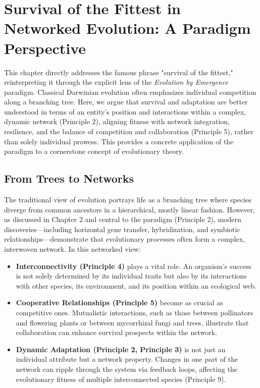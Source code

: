 \documentclass[12pt,openany]{book}
\begin{document}
\chapter{Survival of the Fittest in Networked Evolution: A Paradigm Perspective} %
\label{ch:NetworkedFitness}

This chapter directly addresses the famous phrase "survival of the fittest," reinterpreting it through the explicit lens of the \emph{Evolution by Emergence} paradigm. Classical Darwinian evolution often emphasizes individual competition along a branching tree. Here, we argue that survival and adaptation are better understood in terms of an entity's position and interactions within a complex, dynamic network (Principle 2), aligning fitness with network integration, resilience, and the balance of competition and collaboration (Principle 5), rather than solely individual prowess. This provides a concrete application of the paradigm to a cornerstone concept of evolutionary theory. %

\section{From Trees to Networks}
The traditional view of evolution portrays life as a branching tree where species diverge from common ancestors in a hierarchical, mostly linear fashion. However, as discussed in Chapter 2 and central to the paradigm (Principle 2), modern discoveries—including horizontal gene transfer, hybridization, and symbiotic relationships—demonstrate that evolutionary processes often form a complex, interwoven network. In this networked view:
\begin{itemize}
    \item \textbf{Interconnectivity (Principle 4)} plays a vital role. An organism's success is not solely determined by its individual traits but also by its interactions with other species, its environment, and its position within an ecological web.
    \item \textbf{Cooperative Relationships (Principle 5)} become as crucial as competitive ones. Mutualistic interactions, such as those between pollinators and flowering plants or between mycorrhizal fungi and trees, illustrate that collaboration can enhance survival prospects within the network.
    \item \textbf{Dynamic Adaptation (Principle 2, Principle 3)} is not just an individual attribute but a network property. Changes in one part of the network can ripple through the system via feedback loops, affecting the evolutionary fitness of multiple interconnected species (Principle 9).
\end{itemize} %
\end{document}
